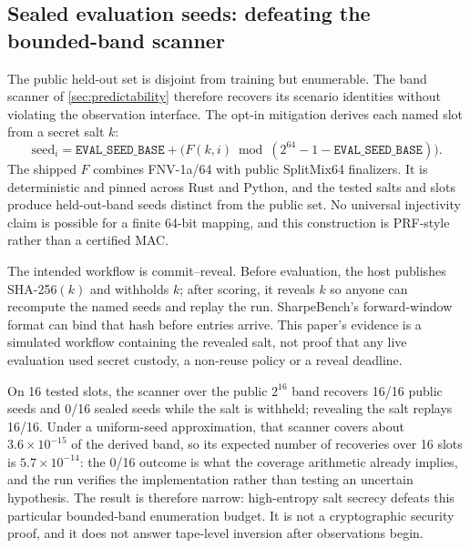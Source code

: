 \subsection{Sealed evaluation seeds: defeating the bounded-band scanner}\label{sec:sealed-seeds}

The public held-out set is disjoint from training but enumerable. The band scanner of \cref{sec:predictability} therefore recovers its scenario identities without violating the observation interface. The opt-in mitigation derives each named slot from a secret salt $k$:
\[
\mathrm{seed}_i=\texttt{EVAL\_SEED\_BASE}+
\bigl(F(k,i)\bmod(2^{64}-1-\texttt{EVAL\_SEED\_BASE})\bigr).
\]
The shipped $F$ combines FNV-1a/64 with public SplitMix64 finalizers. It is deterministic and pinned across Rust and Python, and the tested salts and slots produce held-out-band seeds distinct from the public set. No universal injectivity claim is possible for a finite 64-bit mapping, and this construction is PRF-style rather than a certified MAC.

The intended workflow is commit--reveal. Before evaluation, the host publishes SHA-256$(k)$ and withholds $k$; after scoring, it reveals $k$ so anyone can recompute the named seeds and replay the run. SharpeBench's forward-window format can bind that hash before entries arrive. This paper's evidence is a simulated workflow containing the revealed salt, not proof that any live evaluation used secret custody, a non-reuse policy or a reveal deadline.

On 16 tested slots, the scanner over the public $2^{16}$ band recovers 16/16 public seeds and 0/16 sealed seeds while the salt is withheld; revealing the salt replays 16/16. Under a uniform-seed approximation, that scanner covers about $3.6\times10^{-15}$ of the derived band, so its expected number of recoveries over 16 slots is $5.7\times10^{-14}$: the 0/16 outcome is what the coverage arithmetic already implies, and the run verifies the implementation rather than testing an uncertain hypothesis. The result is therefore narrow: high-entropy salt secrecy defeats this particular bounded-band enumeration budget. It is not a cryptographic security proof, and it does not answer tape-level inversion after observations begin.
